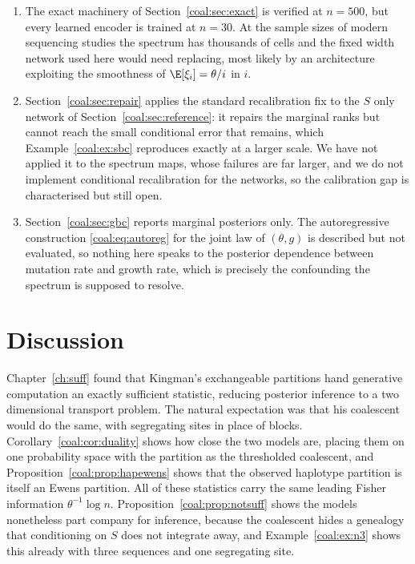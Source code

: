 \begin{enumerate}
\item The exact machinery of Section~\ref{coal:sec:exact} is verified at $n=500$, but every learned encoder is trained at $n=30$. At the sample sizes of modern sequencing studies the spectrum has thousands of cells and the fixed width network used here would need replacing, most likely by an architecture exploiting the smoothness of $\E[\xi_i]=\theta/i$ in $i$.

\item Section~\ref{coal:sec:repair} applies the standard recalibration fix to the $S$ only network of Section~\ref{coal:sec:reference}: it repairs the marginal ranks but cannot reach the small conditional error that remains, which Example~\ref{coal:ex:sbc} reproduces exactly at a larger scale. We have not applied it to the spectrum maps, whose failures are far larger, and we do not implement conditional recalibration for the networks, so the calibration gap is characterised but still open.

\item Section~\ref{coal:sec:gbc} reports marginal posteriors only. The autoregressive construction \eqref{coal:eq:autoreg} for the joint law of $(\theta,g)$ is described but not evaluated, so nothing here speaks to the posterior dependence between mutation rate and growth rate, which is precisely the confounding the spectrum is supposed to resolve.
\end{enumerate}

\section{Discussion}\label{coal:sec:discussion}

Chapter~\ref{ch:suff} found that Kingman's exchangeable partitions hand generative computation an exactly sufficient statistic, reducing posterior inference to a two dimensional transport problem. The natural expectation was that his coalescent would do the same, with segregating sites in place of blocks. Corollary~\ref{coal:cor:duality} shows how close the two models are, placing them on one probability space with the partition as the thresholded coalescent, and Proposition~\ref{coal:prop:hapewens} shows that the observed haplotype partition is itself an Ewens partition. All of these statistics carry the same leading Fisher information $\theta^{-1}\log n$. Proposition~\ref{coal:prop:notsuff} shows the models nonetheless part company for inference, because the coalescent hides a genealogy that conditioning on $S$ does not integrate away, and Example~\ref{coal:ex:n3} shows this already with three sequences and one segregating site.

